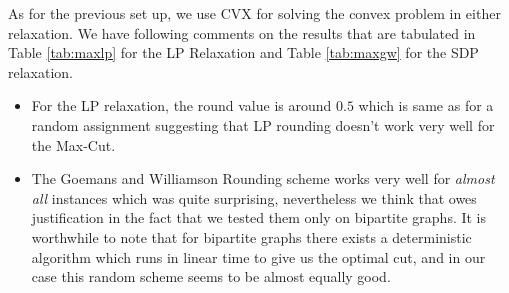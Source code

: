 As for the previous set up, we use CVX for solving the convex problem in either relaxation. We have following comments on the results that are tabulated in Table \ref{tab:maxlp} for the LP Relaxation and Table \ref{tab:maxgw} for the SDP relaxation. 
\begin{itemize}
\item For the LP relaxation, the round value is around $0.5$ which is same as for a random assignment suggesting that LP rounding doesn't work very well for the Max-Cut. 
\item The Goemans and Williamson Rounding scheme works very well for \emph{almost all} instances which was quite surprising, nevertheless we think that owes justification in the fact that we tested them only on bipartite graphs. It is worthwhile to note that for bipartite graphs there exists a deterministic algorithm which runs in linear time to give us the optimal cut, and in our case this random scheme seems to be almost equally good. 
\end{itemize}

